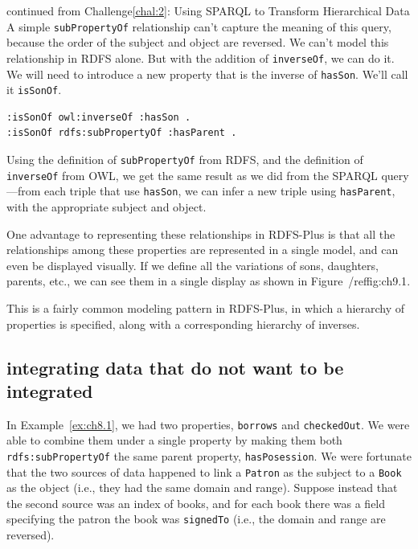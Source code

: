 \begin{challenge}{continued from Challenge\protect\ref{chal:2}: Using SPARQL to Transform Hierarchical Data}
A simple \texttt{subPropertyOf} relationship can't capture the meaning of this
query, because the order of the subject and object are reversed. We
can't model this relationship in RDFS alone. But with the addition of
\texttt{inverseOf}, we can do it. We will need to introduce a new property that
is the inverse of \texttt{hasSon}. We'll call it \texttt{isSonOf}.

\begin{lstlisting}
:isSonOf owl:inverseOf :hasSon .
:isSonOf rdfs:subPropertyOf :hasParent .
\end{lstlisting}

Using the definition of \texttt{subPropertyOf} from RDFS, and the definition of
\texttt{inverseOf} from OWL, we get the same result as we did from the SPARQL
query---from each triple that use \texttt{hasSon}, we can infer a new triple
using \texttt{hasParent}, with the appropriate subject and object.

One advantage to representing these relationships in RDFS-Plus is that
all the relationships among these properties are represented in a single
model, and can even be displayed visually. If we define all the
variations of sons, daughters, parents, etc., we can see them in a
single display as shown in Figure~/ref{fig:ch9.1}.

This is a fairly common modeling pattern in RDFS-Plus, in which a
hierarchy of properties is specified, along with a corresponding
hierarchy of inverses.
\end{challenge}

\subsection{integrating data that do not want to be integrated}

In  Example~\ref{ex:ch8.1}, we had two properties, \texttt{borrows} and
\texttt{checkedOut}. We were able to combine them under a single property by
making them both \texttt{rdfs:subPropertyOf} the same parent property,
\texttt{hasPosession}. We were fortunate that the two sources of data happened to
link a \texttt{Patron} as the subject to a \texttt{Book} as the object (i.e., they had the
same domain and range). Suppose instead that the second source was an
index of books, and for each book there was a field specifying the
patron the book was \texttt{signedTo} (i.e., the domain and range are reversed).

